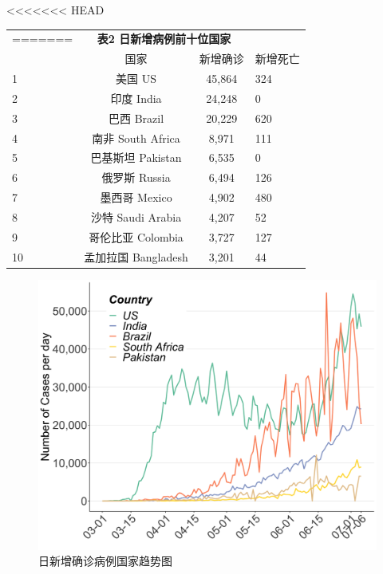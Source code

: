 \documentclass[
]{article}
\begin{document}
\begin{table}[H]
    \centering \begin{table}[H]
\centering\begingroup\fontsize{20}{22}\selectfont

<<<<<<< HEAD
\begin{tabular}{lccl}
=======
\begin{tabular}{rlrr}
>>>>>>> 4a25ed77dcc6617e9c899fe1aa0ff9489b487941
\toprule
\multicolumn{0}{c}{\textbf{ }} & \multicolumn{2}{c}{\textbf{表2 日新增病例前十位国家}} \\
  & 国家 & 新增确诊 & 新增死亡\\
\midrule
\rowcolor{gray!6}  1 & 美国 US & 45,864 & 324\\
2 & 印度 India & 24,248 & 0\\
\rowcolor{gray!6}  3 & 巴西 Brazil & 20,229 & 620\\
4 & 南非 South Africa & 8,971 & 111\\
\rowcolor{gray!6}  5 & 巴基斯坦 Pakistan & 6,535 & 0\\
6 & 俄罗斯 Russia & 6,494 & 126\\
\rowcolor{gray!6}  7 & 墨西哥 Mexico & 4,902 & 480\\
8 & 沙特 Saudi Arabia & 4,207 & 52\\
\rowcolor{gray!6}  9 & 哥伦比亚 Colombia & 3,727 & 127\\
10 & 孟加拉国 Bangladesh & 3,201 & 44\\
\bottomrule
\end{tabular}
\endgroup{}
\end{table} \end{table}
\vspace{5mm}
\begin{figure}[H]
\centering
{}
\caption{日新增确诊病例国家趋势图}
\includegraphics[]{./input/covid2.png}
\end{figure}
\end{document}
